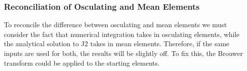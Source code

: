 \subsubsection{Reconciliation of Osculating and Mean Elements}
To reconcile the difference between osculating and mean elements we must consider the fact that numerical integration takes in osculating elements, while the analytical solution to J2 takes in mean elements. Therefore, if the same inputs are used for both, the results will be slightly off. To fix this, the Brouwer transform could be applied to the starting elements.
